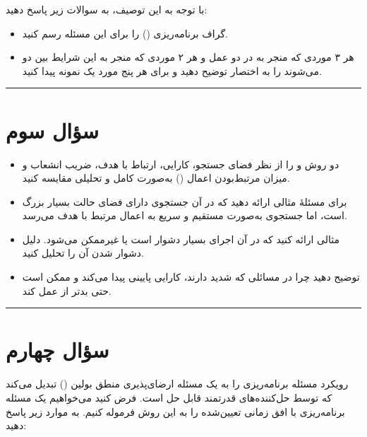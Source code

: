 \documentclass[a4paper,10pt]{article}
\begin{document}
	با توجه به این توصیف، به سوالات زیر پاسخ دهید:
	
	\begin{itemize}
		\item[الف)] گراف برنامه‌ریزی () را برای این مسئله رسم کنید.
		\item[ب)] هر ۳ موردی که منجر به  در دو عمل و هر ۲ موردی که منجر به این شرایط بین دو  می‌شوند را به اختصار توضیح دهید و برای هر پنج مورد یک نمونه  پیدا کنید.
	\end{itemize}
	
	\bigskip
	\bigskip
	\textcolor{AccentCyan}{\rule{\linewidth}{0.4pt}}
	\section{\textcolor{AccentGold}{سؤال سوم}}
	
	\begin{itemize}
		\item[الف)] دو روش  و  را از نظر فضای جستجو، کارایی، ارتباط با هدف، ضریب انشعاب و میزان مرتبط‌بودن اعمال () به‌صورت کامل و تحلیلی مقایسه کنید.
		\item[ب)] برای مسئلهٔ  مثالی ارائه دهید که در آن جستجوی  دارای فضای حالت بسیار بزرگ است، اما جستجوی  به‌صورت مستقیم و سریع به اعمال مرتبط با هدف می‌رسد.
		\item[ج)] مثالی ارائه کنید که در آن اجرای  بسیار دشوار است یا غیرممکن می‌شود. دلیل دشوار شدن آن را تحلیل کنید.
		\item[د)] توضیح دهید چرا  در مسائلی که  شدید دارند، کارایی پایینی پیدا می‌کند و ممکن است حتی بدتر از  عمل کند.
	\end{itemize}
	
	\bigskip
	\bigskip
	\textcolor{AccentCyan}{\rule{\linewidth}{0.4pt}}
	\section{\textcolor{AccentGold}{سؤال چهارم}}
	
	رویکرد  مسئله برنامه‌ریزی را به یک مسئله ارضای‌پذیری منطق بولین () تبدیل می‌کند که توسط حل‌کننده‌های قدرتمند  قابل حل است. فرض کنید می‌خواهیم یک مسئله برنامه‌ریزی با افق زمانی تعیین‌شده را به این روش فرموله کنیم. به موارد زیر پاسخ دهید:
	
\end{document}
